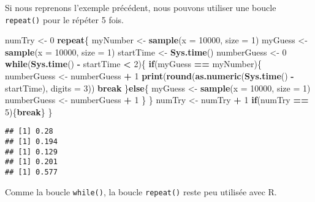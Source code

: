 \documentclass[]{book}
\newenvironment{Shaded}{\begin{snugshade}}{\end{snugshade}}
\newcommand{\KeywordTok}[1]{\textcolor[rgb]{0.13,0.29,0.53}{\textbf{#1}}}
\newcommand{\DataTypeTok}[1]{\textcolor[rgb]{0.13,0.29,0.53}{#1}}
\newcommand{\DecValTok}[1]{\textcolor[rgb]{0.00,0.00,0.81}{#1}}
\newcommand{\StringTok}[1]{\textcolor[rgb]{0.31,0.60,0.02}{#1}}
\newcommand{\ControlFlowTok}[1]{\textcolor[rgb]{0.13,0.29,0.53}{\textbf{#1}}}
\newcommand{\OperatorTok}[1]{\textcolor[rgb]{0.81,0.36,0.00}{\textbf{#1}}}
\newcommand{\NormalTok}[1]{#1}
\theoremstyle{definition}
\theoremstyle{definition}
\theoremstyle{definition}
\theoremstyle{remark}
\begin{document}
Si nous reprenons l'exemple précédent, nous pouvons utiliser une boucle
\texttt{repeat()} pour le répéter 5 fois.

\begin{Shaded}
\begin{Highlighting}[]
\NormalTok{numTry <-}\StringTok{ }\DecValTok{0}
\ControlFlowTok{repeat}\NormalTok{\{}
\NormalTok{  myNumber <-}\StringTok{ }\KeywordTok{sample}\NormalTok{(}\DataTypeTok{x =} \DecValTok{10000}\NormalTok{, }\DataTypeTok{size =} \DecValTok{1}\NormalTok{)}
\NormalTok{  myGuess <-}\StringTok{ }\KeywordTok{sample}\NormalTok{(}\DataTypeTok{x =} \DecValTok{10000}\NormalTok{, }\DataTypeTok{size =} \DecValTok{1}\NormalTok{)}
\NormalTok{  startTime <-}\StringTok{ }\KeywordTok{Sys.time}\NormalTok{()}
\NormalTok{  numberGuess <-}\StringTok{ }\DecValTok{0}
  \ControlFlowTok{while}\NormalTok{(}\KeywordTok{Sys.time}\NormalTok{() }\OperatorTok{-}\StringTok{ }\NormalTok{startTime }\OperatorTok{<}\StringTok{ }\DecValTok{2}\NormalTok{)\{}
    \ControlFlowTok{if}\NormalTok{(myGuess }\OperatorTok{==}\StringTok{ }\NormalTok{myNumber)\{}
\NormalTok{      numberGuess <-}\StringTok{ }\NormalTok{numberGuess }\OperatorTok{+}\StringTok{ }\DecValTok{1}
      \KeywordTok{print}\NormalTok{(}\KeywordTok{round}\NormalTok{(}\KeywordTok{as.numeric}\NormalTok{(}\KeywordTok{Sys.time}\NormalTok{() }\OperatorTok{-}\StringTok{ }\NormalTok{startTime), }\DataTypeTok{digits =} \DecValTok{3}\NormalTok{))}
      \ControlFlowTok{break}
\NormalTok{    \}}\ControlFlowTok{else}\NormalTok{\{}
\NormalTok{      myGuess <-}\StringTok{ }\KeywordTok{sample}\NormalTok{(}\DataTypeTok{x =} \DecValTok{10000}\NormalTok{, }\DataTypeTok{size =} \DecValTok{1}\NormalTok{)}
\NormalTok{      numberGuess <-}\StringTok{ }\NormalTok{numberGuess }\OperatorTok{+}\StringTok{ }\DecValTok{1}
\NormalTok{    \}}
\NormalTok{  \}}
\NormalTok{  numTry <-}\StringTok{ }\NormalTok{numTry }\OperatorTok{+}\StringTok{ }\DecValTok{1}
  \ControlFlowTok{if}\NormalTok{(numTry }\OperatorTok{==}\StringTok{ }\DecValTok{5}\NormalTok{)\{}\ControlFlowTok{break}\NormalTok{\}}
\NormalTok{\}}
\end{Highlighting}
\end{Shaded}

\begin{verbatim}
## [1] 0.28
## [1] 0.194
## [1] 0.129
## [1] 0.201
## [1] 0.577
\end{verbatim}

Comme la boucle \texttt{while()}, la boucle \texttt{repeat()} reste peu
utilisée avec R.
\end{document}
